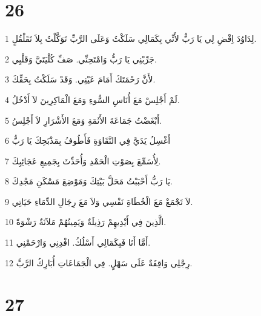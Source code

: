 \chapter{26}

\par 1 لِدَاوُدَ اِقْضِ لِي يَا رَبُّ لأَنِّي بِكَمَالِي سَلَكْتُ وَعَلَى الرَّبِّ تَوَكَّلْتُ بِلاَ تَقَلْقُلٍ.
\par 2 جَرِّبْنِي يَا رَبُّ وَامْتَحِنِّي. صَفِّ كُلْيَتَيَّ وَقَلْبِي.
\par 3 لأَنَّ رَحْمَتَكَ أَمَامَ عَيْنِي. وَقَدْ سَلَكْتُ بِحَقِّكَ.
\par 4 لَمْ أَجْلِسْ مَعَ أُنَاسِ السُّوءِ وَمَعَ الْمَاكِرِينَ لاَ أَدْخُلُ.
\par 5 أَبْغَضْتُ جَمَاعَةَ الأَثَمَةِ وَمَعَ الأَشْرَارِ لاَ أَجْلِسُ.
\par 6 أَغْسِلُ يَدَيَّ فِي النَّقَاوَةِ فَأَطُوفُ بِمَذْبَحِكَ يَا رَبُّ
\par 7 لِأُسَمِّعَ بِصَوْتِ الْحَمْدِ وَأُحَدِّثَ بِجَمِيعِ عَجَائِبِكَ.
\par 8 يَا رَبُّ أَحْبَبْتُ مَحَلَّ بَيْتِكَ وَمَوْضِعَ مَسْكَنِ مَجْدِكَ.
\par 9 لاَ تَجْمَعْ مَعَ الْخُطَاةِ نَفْسِي وَلاَ مَعَ رِجَالِ الدِّمَاءِ حَيَاتِي.
\par 10 الَّذِينَ فِي أَيْدِيهِمْ رَذِيلَةٌ وَيَمِينُهُمْ مَلآنَةٌ رَشْوَةً.
\par 11 أَمَّا أَنَا فَبِكَمَالِي أَسْلُكُ. افْدِنِي وَارْحَمْنِي.
\par 12 رِجْلِي وَاقِفَةٌ عَلَى سَهْلٍ. فِي الْجَمَاعَاتِ أُبَارِكُ الرَّبَّ.

\chapter{27}

